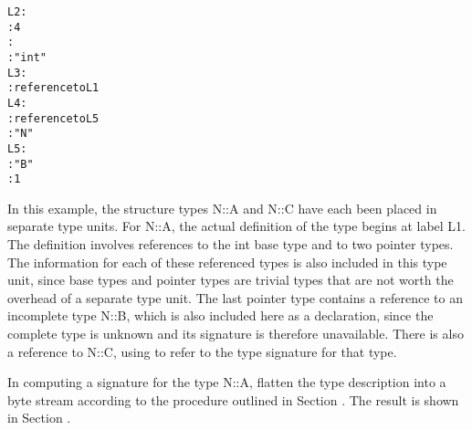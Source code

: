 \begin{alltt}
L2:
          : 4
          : 
          : "int"
L3:
          : reference to L1
L4:
          : reference to L5
          : "N"
L5:
            : "B"
            : 1
\end{alltt}

In this example, the structure types N::A and N::C have each
been placed in separate type units.  For N::A, the actual
definition of the type begins at label L1. The definition
involves references to the int base type and to two pointer
types. The information for each of these referenced types is
also included in this type unit, since base types and pointer
types are trivial types that are not worth the overhead of a
separate type unit. The last pointer type contains a reference
to an incomplete type N::B, which is also included here as
a declaration, since the complete type is unknown and its
signature is therefore unavailable. There is also a reference
to N::C, using 
 to refer to the type signature
for that type.

In computing a signature for the type N::A, flatten the type
description into a byte stream according to the procedure
outlined in 
Section .
The result is shown in 
Section .

